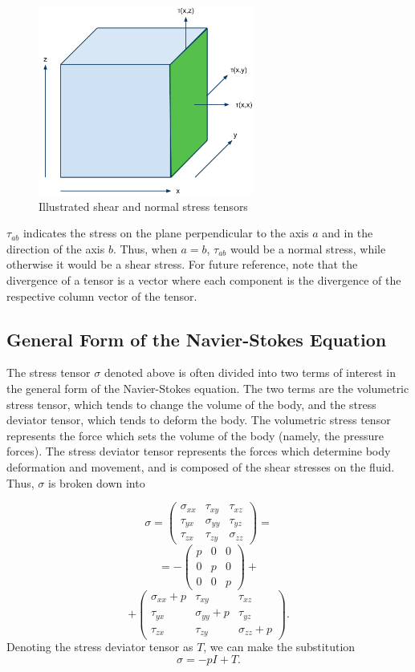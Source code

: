 \documentclass[a4paper]{article}
\begin{document}
\begin{figure}[htb]
    \centering
    \includegraphics[width=200pt]{Stresses.pdf}
    \caption{Illustrated shear and normal stress tensors}
\end{figure}

$\tau_{ab}$ indicates the stress on the plane perpendicular to the axis $a$ and in the direction of the axis $b$. Thus, when $a=b$, $\tau_{ab}$ would be a normal stress, while otherwise it would be a shear stress. For future reference, note that the divergence of a tensor is a vector where each component is the divergence of the respective column vector of the tensor.

\subsection{General Form of the Navier-Stokes Equation}

The stress tensor $\sigma$ denoted above is often divided into two terms of interest in the general form of the Navier-Stokes equation. The two terms are the volumetric stress tensor, which tends to change the volume of the body, and the stress deviator tensor, which tends to deform the body. The volumetric stress tensor represents the force which sets the volume of the body (namely, the pressure forces). The stress deviator tensor represents the forces which determine body deformation and movement, and is composed of the shear stresses on the fluid. Thus, $\sigma$ is broken down into

\[\sigma =  \left( \begin{array}{ccc}
    \sigma_{xx} &  \tau_{xy} & \tau_{xz} \\
\tau_{yx} &  \sigma_{yy} & \tau_{yz} \\
\tau_{zx} &  \tau_{zy} & \sigma_{zz}
\end{array} \right) = \] \[ = -\left( \begin{array}{ccc}
    p &  0 & 0 \\
0 &  p & 0 \\
0 &  0 & p 
\end{array} \right) +\]\[+ \left( \begin{array}{ccc}
    \sigma_{xx} + p &  \tau_{xy} & \tau_{xz} \\
\tau_{yx} &  \sigma_{yy} + p & \tau_{yz} \\
\tau_{zx} &  \tau_{zy} & \sigma_{zz} + p
\end{array} \right).\]
Denoting the stress deviator tensor as $T$, we can make the substitution
\[\sigma = -pI + T.\]\\
\end{document}
